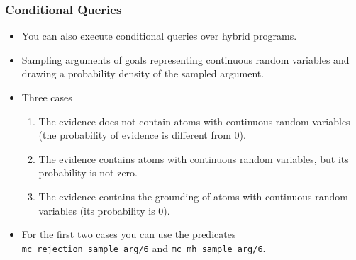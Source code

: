 \documentclass[trans]{beamer}
\begin{document}
\begin{frame}[fragile]
  \frametitle{Conditional Queries}
  \begin{itemize}
\item You can also execute conditional queries over hybrid programs.
\item Sampling arguments of goals representing continuous random variables and drawing a probability density of the sampled argument. 
\item Three cases
  \begin{enumerate}
\item The evidence does not contain atoms with continuous random variables (the probability of evidence is different from 0).
\item The evidence contains atoms with continuous random variables, but its probability is not zero.
\item The evidence contains the grounding of atoms with continuous random variables (its probability is 0).
\end{enumerate}
\item 
For the first two cases you can use the predicates \verb|mc_rejection_sample_arg/6| and \verb|mc_mh_sample_arg/6|.
\end{itemize}
\end{frame}
\end{document}

